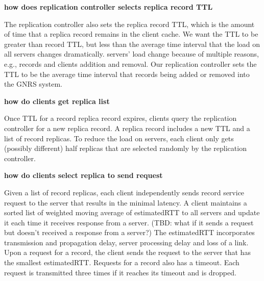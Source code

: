 {{{\bf how does replication controller selects replica record TTL}

The replication controller also sets the replica record TTL, which is the amount of time that a replica record remains in the client cache.  We want the TTL to be greater than record TTL, but less than the average time interval that the load on all servers changes dramatically. servers' load change because of multiple reasons, e.g., records and clients addition and removal. Our replication controller sets the TTL to be the average time interval that records being added or removed into the GNRS system.  

{\bf how do clients get replica list}

Once TTL for a record replica record expires, clients query the replication controller for a new replica record. A replica record includes a new TTL and a list of record replicas. To reduce the load on servers, each client only gets (possibly different) half replicas that are selected randomly by the replication controller. 
  
{\bf how do clients select replica to send request}

Given a list of record replicas, each client independently sends record service request to the server that results in the minimal latency. A client maintains a sorted list of weighted moving average of estimatedRTT to all servers and update it each time it receives response from a server. (TBD: what if it sends a request but doesn't received a response from a server?) The estimatedRTT incorporates transmission and propagation delay, server processing delay and loss of a link. Upon a request for a record, the client sends the request to the server that has the smallest estimatedRTT. Requests for a record also has a timeout.  Each request is transmitted three times if it reaches its timeout and is dropped. 
}




}
